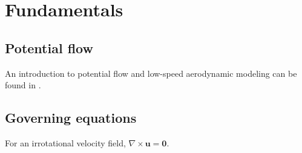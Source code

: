 \chapter{Fundamentals}
\ChapterTOC

\section{Potential flow}
An introduction to potential flow and low-speed aerodynamic modeling can be found in \cite{katz2001}.

\section{Governing equations}
For an irrotational velocity field, $\nabla\times\mathbf{u}=\mathbf{0}$.

\ChapterReferences
